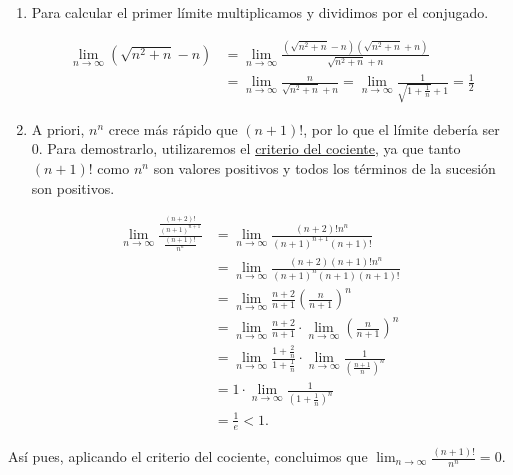 \documentclass[
  spanish,
  a4paper,
]{scrreport}
\theoremstyle{definition}
\theoremstyle{remark}
\begin{document}
\begin{tcolorbox}[enhanced jigsaw, arc=.35mm, bottomrule=.15mm, bottomtitle=1mm, breakable, colback=white, colbacktitle=quarto-callout-tip-color!10!white, colframe=quarto-callout-tip-color-frame, coltitle=black, left=2mm, leftrule=.75mm, opacityback=0, opacitybacktitle=0.6, rightrule=.15mm, title=\textcolor{quarto-callout-tip-color}{\faLightbulb}\hspace{0.5em}{Solución}, titlerule=0mm, toprule=.15mm, toptitle=1mm]

\begin{enumerate}
\def\labelenumi{\alph{enumi}.}
\item
  Para calcular el primer límite multiplicamos y dividimos por el
  conjugado.

  \begin{align*}
  \lim_{n \to \infty} \left(\sqrt{n^2+n}-n\right) 
  &= \lim_{n \to \infty} \frac{(\sqrt{n^2+n}-n)(\sqrt{n^2+n}+n)}{\sqrt{n^2+n}+n} \\
  &= \lim_{n \to \infty} \frac{n}{\sqrt{n^2+n}+n} = \lim_{n \to \infty} \frac{1}{\sqrt{1+\frac{1}{n}}+1} = \frac{1}{2}
  \end{align*}
\item
  A priori, \(n^n\) crece más rápido que \((n+1)!\), por lo que el
  límite debería ser 0. Para demostrarlo, utilizaremos el
  \href{https://aprendeconalf.es/analisis-manual/04-sucesiones.html\#prp-criterio-cociente-sucesiones}{criterio
  del cociente}, ya que tanto \((n+1)!\) como \(n^n\) son valores
  positivos y todos los términos de la sucesión son positivos.
\end{enumerate}

\begin{align*}
\lim_{n \to \infty} \frac{\frac{(n+2)!}{(n+1)^{n+1}}}{\frac{(n+1)!}{n^n}} 
&= \lim_{n \to \infty} \frac{(n+2)! n^n}{(n+1)^{n+1} (n+1)!} \\
&= \lim_{n \to \infty} \frac{(n+2)(n+1)! n^n}{(n+1)^n(n+1) (n+1)!} \\
&= \lim_{n \to \infty} \frac{n+2}{n+1}\left(\frac{n}{n+1}\right)^n \\
&= \lim_{n \to \infty} \frac{n+2}{n+1} \cdot \lim_{n \to \infty} \left(\frac{n}{n+1}\right)^n \\
&= \lim_{n\to \infty}\frac{1+\frac{2}{n}}{1+\frac{1}{n}} \cdot \lim_{n \to \infty} \frac{1}{\left(\frac{n+1}{n}\right)^n} \\
&= 1 \cdot \lim_{n \to \infty} \frac{1}{\left(1+\frac{1}{n}\right)^n} \\
&= \frac{1}{e} < 1.
\end{align*}

Así pues, aplicando el criterio del cociente, concluimos que
\(\lim_{n \to \infty} \frac{(n+1)!}{n^n} = 0\).

\end{tcolorbox}
\end{document}
